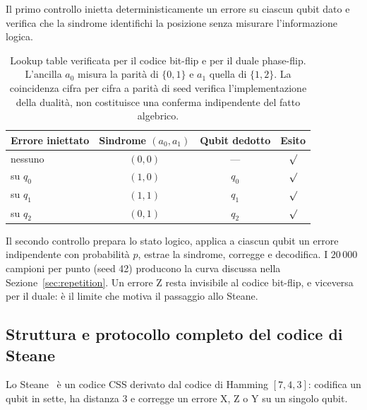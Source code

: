 \begin{onehalfspace}
Il primo controllo inietta deterministicamente un errore su ciascun qubit
dato e verifica che la sindrome identifichi la posizione senza misurare
l'informazione logica.

\begin{table}[H]

\centering
\begin{tabular}{lccc}
\toprule
\textbf{Errore iniettato} & \textbf{Sindrome $(a_0,a_1)$} & \textbf{Qubit dedotto} & \textbf{Esito} \\
\midrule
nessuno & $(0,0)$ & --- & $\surd$ \\
\addlinespace[0.3em]
su $q_0$ & $(1,0)$ & $q_0$ & $\surd$ \\
\addlinespace[0.3em]
su $q_1$ & $(1,1)$ & $q_1$ & $\surd$ \\
\addlinespace[0.3em]
su $q_2$ & $(0,1)$ & $q_2$ & $\surd$ \\
\bottomrule
\end{tabular}
\caption[Verifica della sindrome del codice a ripetizione]{Lookup table
verificata per il codice bit-flip e per il duale phase-flip. L'ancilla
$a_0$ misura la parità di $\{0,1\}$ e $a_1$ quella di $\{1,2\}$. La
coincidenza cifra per cifra a parità di seed verifica l'implementazione
della dualità, non costituisce una conferma indipendente del fatto
algebrico.}\label{tab:sindrome_repetition}

\end{table}

Il secondo controllo prepara lo stato logico, applica a ciascun qubit un
errore indipendente con probabilità $p$, estrae la sindrome, corregge e
decodifica. I $20\,000$ campioni per punto (seed 42) producono la curva
discussa nella Sezione~\ref{sec:repetition}. Un errore Z resta
invisibile al codice bit-flip, e viceversa per il duale: è il limite che
motiva il passaggio allo Steane.

\subsection{Struttura e protocollo completo del codice di Steane}
\label{app:qec_steane}

Lo Steane~\cite{steane1996} è un codice \ac{CSS} derivato dal codice di
Hamming $[7,4,3]$: codifica un qubit in sette, ha distanza 3 e corregge
un errore X, Z o Y su un singolo qubit.

\begin{table}[H]


\end{table}
\end{onehalfspace}
